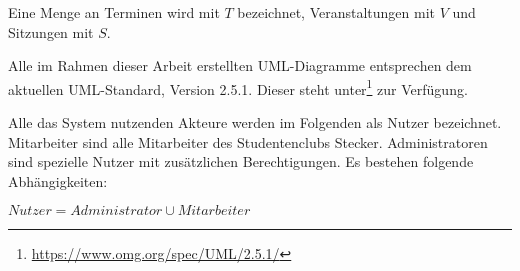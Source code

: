 Eine Menge an Terminen wird mit $T$ bezeichnet, Veranstaltungen mit $V$ und Sitzungen mit $S$.

Alle im Rahmen dieser Arbeit erstellten UML-Diagramme entsprechen dem aktuellen UML-Standard, Version 2.5.1. Dieser steht unter\footnote{\url{https://www.omg.org/spec/UML/2.5.1/}} zur Verfügung.

Alle das System nutzenden Akteure werden im Folgenden als Nutzer bezeichnet. Mitarbeiter sind alle Mitarbeiter des Studentenclubs Stecker. Administratoren sind spezielle Nutzer mit zusätzlichen Berechtigungen.
Es bestehen folgende Abhängigkeiten: 

$Nutzer = Administrator \cup Mitarbeiter$ 

